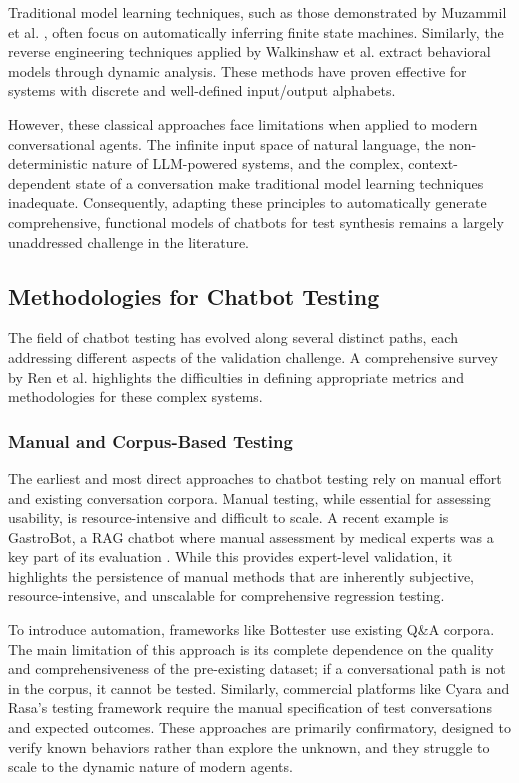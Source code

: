 Traditional model learning techniques,
such as those demonstrated by Muzammil et al. \autocite{shahbazAnalysisTestingBlackbox2014},
often focus on automatically inferring finite state machines.
Similarly, the reverse engineering techniques applied by Walkinshaw et al. \autocite{walkinshawReverseEngineeringSoftwareBehavior2013}
extract behavioral models through dynamic analysis.
These methods have proven effective for systems with discrete and well-defined input/output alphabets.

However, these classical approaches
face limitations when applied to modern conversational agents.
The infinite input space of natural language,
the non-deterministic nature of \ac{LLM}-powered systems,
and the complex, context-dependent state of a conversation
make traditional model learning techniques inadequate.
Consequently,
adapting these principles to automatically generate
comprehensive, functional models of chatbots for test synthesis
remains a largely unaddressed challenge in the literature.

\subsection{Methodologies for Chatbot Testing}

The field of chatbot testing has evolved along several distinct paths,
each addressing different aspects of the validation challenge.
A comprehensive survey by Ren et al. \autocite{renEvaluationTechniquesChatbot2019} highlights the difficulties
in defining appropriate metrics and methodologies for these complex systems.

\subsubsection{Manual and Corpus-Based Testing}

The earliest and most direct approaches to chatbot testing
rely on manual effort and existing conversation corpora.
Manual testing, while essential for assessing usability,
is resource-intensive and difficult to scale.
A recent example is GastroBot,
a \ac{RAG} chatbot where manual assessment by medical experts
was a key part of its evaluation \autocite{zhouGastroBotChineseGastrointestinal2024}.
While this provides expert-level validation,
it highlights the persistence of manual methods
that are inherently subjective, resource-intensive,
and unscalable for comprehensive regression testing.

To introduce automation, frameworks like Bottester
\autocite{vasconcelosBottesterTestingConversational2017}
use existing Q\&A corpora.
The main limitation of this approach
is its complete dependence on
the quality and comprehensiveness of the pre-existing dataset;
if a conversational path is not in the corpus, it cannot be tested.
Similarly, commercial platforms like Cyara \autocite{CyaraBotium}
and Rasa's testing framework \autocite{RasaTest2025}
require the manual specification of test conversations and expected outcomes.
These approaches are primarily confirmatory,
designed to verify known behaviors rather than explore the unknown,
and they struggle to scale to the dynamic nature of modern agents.

